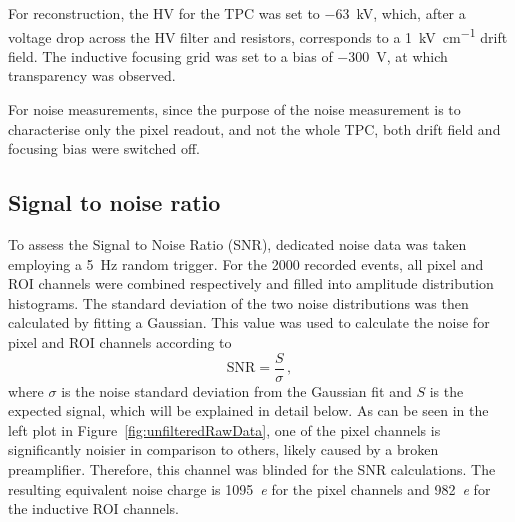 \documentclass[a4paper]{article}
\newcommand*{\m}{\mathrm}
\begin{document}
 
For reconstruction, the HV for the TPC was set to \SI{-63}{\kilo\volt}, which, after a voltage drop across the HV filter and resistors, corresponds to a \SI{1}{\kilo\volt\per\centi\meter} drift field. The inductive focusing grid was set to a bias of \SI{-300}{\volt}, at which transparency was observed. 

For noise measurements, since the purpose of the noise measurement is to characterise only the pixel readout, and not the whole TPC, both drift field and focusing bias were switched off. 


\subsection{Signal to noise ratio}

To assess the Signal to Noise Ratio (SNR), dedicated noise data was taken employing a \SI{5}{\hertz} random trigger.
For the \num{2000} recorded events, all pixel and ROI channels were combined respectively and filled into amplitude distribution histograms.
The standard deviation of the two noise distributions was then calculated by fitting a Gaussian.
This value was used to calculate the noise for pixel and ROI channels according to
\begin{equation}
\m{SNR} = \frac{S}{\sigma}\,\m{,}
\label{eq:snr}
\end{equation}
where $\sigma$ is the noise standard deviation from the Gaussian fit and $S$ is the expected signal, which will be explained in detail below.
As can be seen in the left plot in Figure~\ref{fig:unfilteredRawData}, one of the pixel channels is significantly noisier in comparison to others, likely caused by a broken preamplifier.
Therefore, this channel was blinded for the SNR calculations.
The resulting equivalent noise charge is \SI{1095}{\elementarycharge} for the pixel channels and \SI{982}{\elementarycharge} for the inductive ROI channels.
\end{document}
